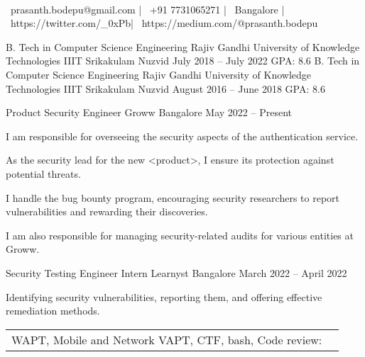 \documentclass[]{awesome-cv}
\begin{document}
    
\begin{center}
	  \\
	\vspace{2mm}
	{\faEnvelope\ prasanth.bodepu@gmail.com} | {\faMobile\ +91 7731065271} | {\faMapMarker\ Bangalore} | {\faLink\ https://twitter.com/_0xPb}| {\faLink\ https://medium.com/@prasanth.bodepu}
\end{center}
\begin{cventries}
	\cventry
	{B. Tech in Computer Science Engineering}
	{Rajiv Gandhi University of Knowledge Technologies IIIT Srikakulam}
	{Nuzvid}
	{July 2018 – July 2022}
	{GPA: 8.6}
	\cventry
	{B. Tech in Computer Science Engineering}
	{Rajiv Gandhi University of Knowledge Technologies IIIT Srikakulam}
	{Nuzvid}
	{August 2016 – June 2018}
	{GPA: 8.6}
\end{cventries}

\vspace{-2mm}
\begin{cventries}
	\cventry
	{Product Security Engineer}
	{Groww}
	{Bangalore}
	{May 2022 – Present}
	{\begin{cvitems}
		\item {I am responsible for overseeing the security aspects of the authentication service.}
		\item {As the security lead for the new \textless{}product\textgreater{}, I ensure its protection against potential threats.}
		\item {I handle the bug bounty program, encouraging security researchers to report vulnerabilities and rewarding their discoveries.}
		\item {I am also responsible for managing security-related audits for various entities at Groww.}
		\end{cvitems}}
	\cventry
	{Security Testing Engineer Intern}
	{Learnyst}
	{Bangalore}
	{March 2022 – April 2022}
	{\begin{cvitems}
		\item {Identifying security vulnerabilities, reporting them, and offering effective remediation methods.}
		\end{cvitems}}
\end{cventries}
\begin{cventries}
	\cventry
	{}
	{\def\arraystretch{1.15}{\begin{tabular}{ l l }
		WAPT, Mobile and Network VAPT, CTF, bash, Code review:  & {\skill{ Product Security, PRD Review, Code Review, Automation}} \\
		\end{tabular}}}
	{}
	{}
	{}
\end{cventries}
\end{document}
